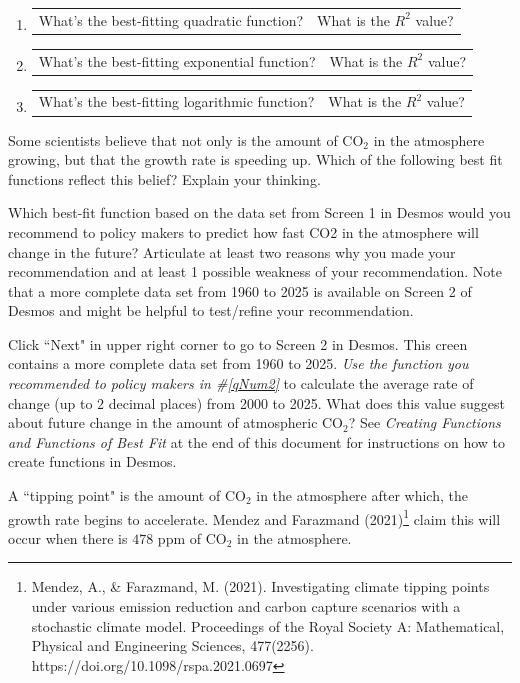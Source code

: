 \documentclass[11pt]{article}
\begin{document}
{\begin{enumerate}
\item \begin{tabular}{p{4in} l} What's the best-fitting quadratic function? & What is the $R^2$ value?\end{tabular}
\item \begin{tabular}{p{4in} l} What's the best-fitting exponential function? & What is the $R^2$ value?\end{tabular}
\item\begin{tabular}{p{4in} l} What's the best-fitting logarithmic function? & What is the $R^2$ value?\end{tabular}
\end{enumerate} 
 \item Some scientists believe that not only is the amount of CO$_2$ in the atmosphere growing, but that the growth rate is speeding up.  Which of the following best fit functions reflect this belief? Explain your thinking.
 \newpage
\item   Which best-fit function based on the data set from Screen 1 in Desmos would you recommend to policy makers to predict how fast CO2 in the atmosphere will change in the future?  Articulate at least two reasons why you made your recommendation and at least 1 possible weakness of your recommendation. Note that a more complete data set from 1960 to 2025 is available on Screen 2 of Desmos and might be helpful to test/refine your recommendation. \label{qNum2}
\item Click ``Next" in upper right corner to go to Screen 2 in Desmos.  This creen  contains a more complete data set from 1960 to 2025.   {\em Use the function you recommended to policy makers in \#\ref{qNum2}} to calculate the average rate of change (up to $2$ decimal places) from 2000 to 2025.  What does this value suggest about future change in the amount of atmospheric CO$_2$? See {\em Creating Functions and Functions of Best Fit} at the end of this document for instructions on how to create functions in Desmos.
\newpage
 \item A ``tipping point" is the amount of CO$_2$ in the atmosphere after which, the growth rate begins to accelerate.  Mendez and Farazmand (2021)\footnote{Mendez, A., \& Farazmand, M. (2021). Investigating climate tipping points under various emission reduction and carbon capture scenarios with a stochastic climate model. Proceedings of the Royal Society A: Mathematical, Physical and Engineering Sciences, 477(2256). https://doi.org/10.1098/rspa.2021.0697} claim this will occur when there is $478$ ppm of CO$_2$ in the atmosphere. 
\vfill

}

  \newpage

\end{document}
